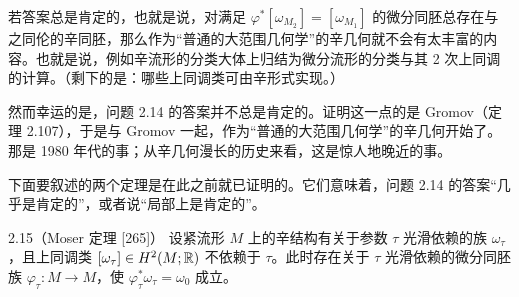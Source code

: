 若答案总是肯定的，也就是说，对满足 $\varphi^*[\omega_{M_2}]=[\omega_{M_1}]$ 的微分同胚总存在与之同伦的辛同胚，那么作为“普通的大范围几何学”的辛几何就不会有太丰富的内容。也就是说，例如辛流形的分类大体上归结为微分流形的分类与其 2 次上同调的计算。（剩下的是：哪些上同调类可由辛形式实现。）

然而幸运的是，问题 2.14 的答案并不总是肯定的。证明这一点的是 Gromov（定理 2.107），于是与 Gromov 一起，作为“普通的大范围几何学”的辛几何开始了。那是 1980 年代的事；从辛几何漫长的历史来看，这是惊人地晚近的事。

下面要叙述的两个定理是在此之前就已证明的。它们意味着，问题 2.14 的答案“几乎是肯定的”，或者说“局部上是肯定的”。

\begin{theorem*}{2.15}（Moser 定理 [265]）
  设紧流形 $M$ 上的辛结构有关于参数 $\tau$ 光滑依赖的族 $\omega_\tau$，且上同调类 $[\omega_\tau]\in H^2(M;\mathbb{R})$ 不依赖于 $\tau$。此时存在关于 $\tau$ 光滑依赖的微分同胚族 $\varphi_\tau\colon M\to M$，使 $\varphi_\tau^*\omega_\tau=\omega_0$ 成立。
\end{theorem*}

